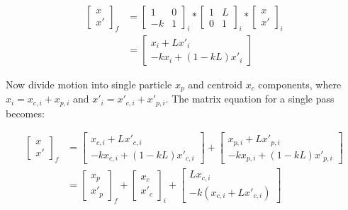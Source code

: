 \begin{equation}
\begin{split}
\begin{bmatrix} x \\ x' \end{bmatrix}_f 
& = \begin{bmatrix} 1&0 \\ -k&1 \end{bmatrix}_i \ast \begin{bmatrix} 1&L \\ 0&1 \end{bmatrix}_i \ast \begin{bmatrix} x \\ x' \end{bmatrix}_i \\
& = \begin{bmatrix} x_i + Lx'_i \\ -kx_i + (1-kL)x'_i \end{bmatrix}
\end{split}
\end{equation}

Now divide motion into single particle $x_p$ and centroid $x_c$ components, where $x_i = x_{c,i} + x_{p,i}$ and $x'_i = x'_{c,i} + x'_{p,i}$. The matrix equation for a single pass becomes:

\begin{equation}
\begin{split}
\begin{bmatrix} x \\ x' \end{bmatrix}_f 
&= \begin{bmatrix} x_{c,i} + Lx'_{c,i} \\ -kx_{c,i} + (1-kL)x'_{c,i} \end{bmatrix} + \begin{bmatrix} x_{p,i} + Lx'_{p,i} \\ -kx_{p,i} + (1-kL)x'_{p,i} \end{bmatrix} \\
&=\begin{bmatrix} x_p \\ x'_p \end{bmatrix}_f + \begin{bmatrix} x_c \\ x'_c \end{bmatrix}_i + \begin{bmatrix} L x_{c,i} \\ -k(x_{c,i} + Lx'_{c,i}) \end{bmatrix}
\end{split}
\end{equation}


